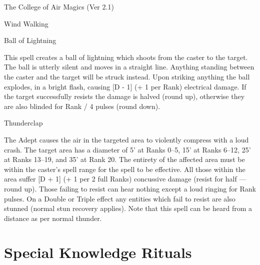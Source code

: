 \begin{Chapter}{The College of Air Magics (Ver 2.1)}
\begin{spell}[S-17]{Wind Walking }
\begin{effects}
\end{effects}
\end{spell}

\begin{spell}[S-18]{Ball of Lightning }

\begin{effects}
This spell creates a ball of lightning which 
shoots  from  the  caster  to  the  target.  The  ball  is 
utterly silent and moves in a straight line. Anything 
standing  between  the  caster  and  the  target  will  be 
struck  instead.  Upon  striking  anything  the  ball 
explodes, in a bright flash, causing [D - 1] (+ 1 per 
Rank)  electrical  damage.  If  the  target  successfully 
resists  the  damage  is halved  (round up),  otherwise 
they  are  also  blinded  for  Rank  /  4  pulses  (round 
down). 

\end{effects}
\end{spell}

\begin{spell}[S-19]{Thunderclap }

\begin{effects}
 The  Adept  causes  the  air  in  the  targeted 
area  to  violently  compress  with  a  loud  crash.  The 
target area has a diameter of 5’ at Ranks 0–5, 15’ at 
Ranks 6–12, 25’ at Ranks 13–19, and 35’ at Rank 
20. The entirety of the affected area must be within 
the caster’s spell range for the spell to be effective. 
All those within the area suffer [D + 1] (+ 1 per 2 
full  Ranks)  concussive  damage  (resist  for  half  — 
round up). Those failing to resist can hear nothing 
except a loud ringing for Rank pulses. On a Double 
or Triple effect any entities which fail to resist are 
also  stunned  (normal  stun  recovery  applies).  Note 
that  this  spell  can  be  heard  from a  distance  as  per 
normal thunder. 


\end{effects}
\end{spell}

\section{Special Knowledge Rituals}


\end{Chapter}
